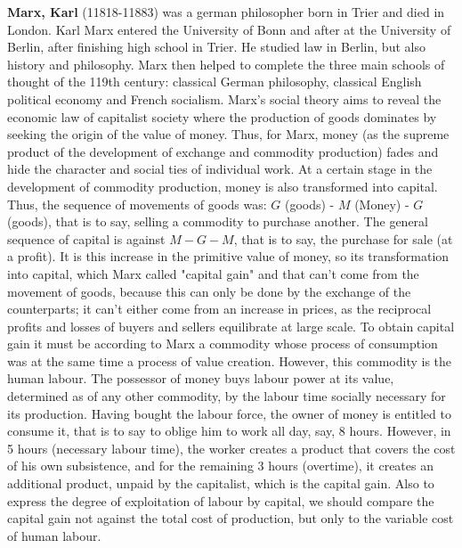 \textbf{Marx, Karl} (11818-11883) was a german philosopher born in Trier and died in London. Karl Marx entered the University of Bonn and after at the University of Berlin, after finishing high school in Trier. He studied law in Berlin, but also  history and philosophy. Marx then helped to complete the three main schools of thought of the 119th century: classical German philosophy, classical English political economy and French socialism. Marx's social theory aims to reveal the economic law of capitalist society where the production of goods dominates by seeking the origin of the value of money. Thus, for Marx, money (as the supreme product of the development of exchange and commodity production) fades and hide the character and social ties of individual work. At a certain stage in the development of commodity production, money is also transformed into capital. Thus, the sequence of movements of goods was: $G$ (goods) - $M$ (Money) - $G$ (goods), that is to say, selling a commodity to purchase another. The general sequence of capital is against $M-G-M$, that is to say, the purchase for sale (at a profit). It is this increase in the primitive value of money, so its transformation into capital, which Marx called "capital gain" and that can't come from the movement of goods, because this can only be done by the exchange of the counterparts; it can't either come from an increase in prices, as the reciprocal profits and losses of buyers and sellers equilibrate at large scale. To obtain capital gain it must be according to Marx a commodity whose process of consumption was at the same time a process of value creation. However, this commodity is the human labour. The possessor of money buys labour power at its value, determined as of any other commodity, by the labour time socially necessary for its production. Having bought the labour force, the owner of money is entitled to consume it, that is to say to oblige him to work all day, say, 8 hours. However, in 5 hours (necessary labour time), the worker creates a product that covers the cost of his own subsistence, and for the remaining 3 hours (overtime), it creates an additional product, unpaid by the capitalist, which is the capital gain. Also to express the degree of exploitation of labour by capital, we should compare the capital gain not against the total cost of production, but only to the variable cost of human labour.


